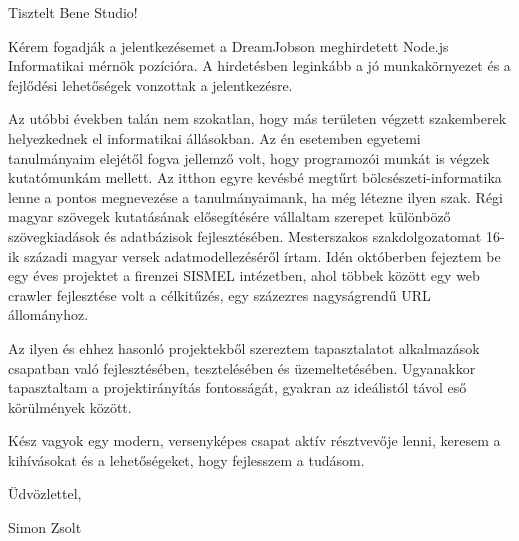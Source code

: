 


\setlength{\parindent}{1.5em}
\renewcommand{\baselinestretch}{1.1}


	

	\thispagestyle{empty}
		
	Tisztelt Bene Studio!

	\vspace{1em}

	Kérem fogadják a jelentkezésemet a DreamJobson meghirdetett Node.js Informatikai mérnök pozícióra. 
	A hirdetésben leginkább a jó munkakörnye\-zet és a fejlődési lehetőségek vonzottak a jelentkezésre.

	Az utóbbi években talán nem szokatlan, hogy más területen végzett szakemberek helyezkednek el informatikai állásokban.
	Az én esetemben egyetemi tanulmányaim elejétől fogva jellemző volt, hogy programozói munkát is végzek kutatómunkám mellett.
	Az itthon egyre kevésbé megtűrt bölcsészeti-informatika lenne a pontos megnevezése a tanulmányaimank, ha még létezne ilyen szak.
	Régi magyar szövegek kutatásának elősegítésére vállaltam szerepet különböző szövegkiadások és adatbázisok fejlesztésében. 
	Mesterszakos szakdolgozatomat 16-ik századi magyar versek adatmodellezéséről írtam.
	Idén októberben fejeztem be egy éves projektet a firenzei SISMEL intézetben, ahol többek között egy web crawler fejlesztése volt a célkitűzés, egy százezres nagyságrendű URL állományhoz.

	Az ilyen és ehhez hasonló projektekből szereztem tapasztalatot alkalmazások csapatban való fejlesztésében, tesztelésében és üzemeltetésében.
	Ugyanakkor tapasztaltam a projektirányítás fontosságát, gyakran az ide\-álistól távol eső körülmények között.

	Kész vagyok egy modern, versenyképes csapat aktív résztvevője lenni, keresem a kihívásokat és a lehetőségeket, hogy fejlesszem a tudásom.

	\begin{flushleft}
		Üdvözlettel,

		Simon Zsolt
	\end{flushleft}

